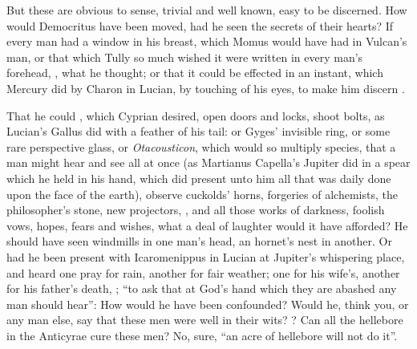 But these are obvious to sense, trivial and well known, easy to be discerned.
How would Democritus have been moved, had he seen the
secrets of their hearts? If every man had a window in his breast, which Momus
would have had in Vulcan's man, or that which Tully so much wished it were
written in every man's forehead, , what
he thought; or that it could be effected in an instant, which Mercury did by
Charon in Lucian, by touching of his eyes, to make him discern .


That he could , which Cyprian desired, open doors and locks,
shoot bolts, as Lucian's Gallus did with a feather of his tail: or Gyges'
invisible ring, or some rare perspective glass, or \emph{Otacousticon}, which
would so multiply species, that a man might hear and see all at once (as
Martianus Capella's Jupiter did in a spear which he held in
his hand, which did present unto him all that was daily done upon the face of
the earth), observe cuckolds' horns, forgeries of alchemists, the philosopher's
stone, new projectors, \etc{}, and all those works of darkness, foolish vows,
hopes, fears and wishes, what a deal of laughter would it have afforded? He
should have seen windmills in one man's head, an hornet's nest in another. Or
had he been present with Icaromenippus in Lucian at Jupiter's whispering place,
and heard one pray for rain, another for fair weather; one
for his wife's, another for his father's death, \etc{}; \enquote{to ask that at God's
hand which they are abashed any man should hear}: How would he have been
confounded? Would he, think you, or any man else, say that these men were well
in their wits? ? Can all
the hellebore in the Anticyrae cure these men? No, sure,
\enquote{an acre of hellebore will not do it}.

